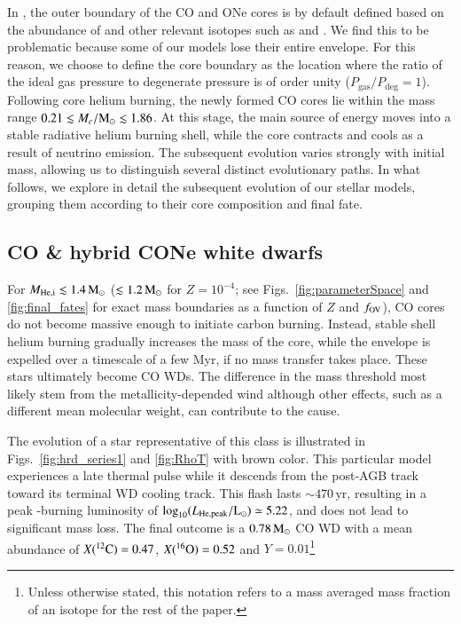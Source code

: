 \documentclass[main.tex]{subfiles}
\begin{document}
In \mesa, the outer boundary of the CO and ONe cores is by default defined based on the abundance of  and other relevant isotopes such as  and . We find this to be problematic because some of our models lose their entire  envelope. For this reason, we choose to define the core boundary as the location where the ratio of the ideal gas pressure to degenerate 
pressure is of  order  unity ($P_{\text{gas}} / P_{\text{deg}} = 1$).
Following  core helium burning, the newly formed CO cores lie within the mass range $0.21 
\lesssim M_c/\rm M_\odot \lesssim 1.86$. 
At this stage, the main source of energy moves into a stable radiative helium burning shell, while 
the core contracts and cools as a result of neutrino emission. The subsequent evolution varies 
strongly with initial mass, allowing us to distinguish several distinct evolutionary paths. In what follows, 
we explore in detail the subsequent evolution of our \seriesone stellar models, grouping them 
according to their core composition and final fate. 



\subsection{CO \& hybrid CONe white dwarfs}\label{sec:wd_evolution}
For $M_{\rm{He, i}}\lesssim 1.4\msun$ 
($\lesssim1.2\msun$ for $Z=10^{-4}$;  see 
Figs.~\ref{fig:parameterSpace} and \ref{fig:final_fates}  for 
exact mass boundaries as a function of $Z$ and $f_{\rm OV}$), CO cores do not become massive enough 
to initiate carbon burning. Instead, stable shell helium burning gradually increases the mass of the core, while the envelope is expelled over a timescale of a few Myr, if no mass transfer takes place. These stars ultimately become CO WDs. The difference in the mass threshold most likely stem from the metallicity-depended wind although other effects, such as a different mean molecular weight, can contribute to the cause.

The evolution of a star representative of this class is 
illustrated in Figs.~\ref{fig:hrd_series1} and \ref{fig:RhoT} with brown color.  
This particular model experiences a late thermal pulse  
while it descends from the post-AGB 
track toward its terminal WD cooling track. This 
flash lasts $\sim 470\,\text{yr}$, resulting in a peak -burning luminosity of 
$\log_{10}(L_{\rm He, peak}/{\rm L}_\odot) \simeq 5.22$, and does not lead to significant mass loss. The final outcome is a $0.78\msun$ CO WD  with a mean abundance of $X(\iso{C}{12}) = 0.47$, $X(\iso{O}{16}) = 0.52$ and $Y = 0.01$\footnote{Unless otherwise stated, this notation refers to a mass averaged mass fraction of an isotope for the rest of the paper.}
\end{document}
